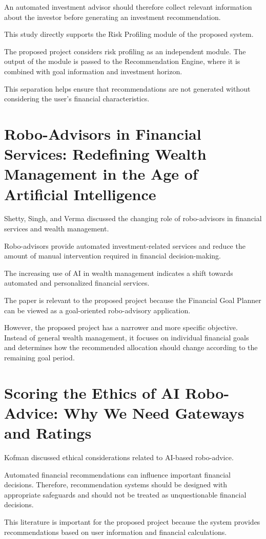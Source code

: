 An automated investment advisor should therefore collect relevant information about the investor before generating an investment recommendation.

This study directly supports the Risk Profiling module of the proposed system.

The proposed project considers risk profiling as an independent module. The output of the module is passed to the Recommendation Engine, where it is combined with goal information and investment horizon.

This separation helps ensure that recommendations are not generated without considering the user's financial characteristics.

\section{Robo-Advisors in Financial Services: Redefining Wealth Management in the Age of Artificial Intelligence}
Shetty, Singh, and Verma discussed the changing role of robo-advisors in financial services and wealth management.

Robo-advisors provide automated investment-related services and reduce the amount of manual intervention required in financial decision-making.

The increasing use of AI in wealth management indicates a shift towards automated and personalized financial services.

The paper is relevant to the proposed project because the Financial Goal Planner can be viewed as a goal-oriented robo-advisory application.

However, the proposed project has a narrower and more specific objective. Instead of general wealth management, it focuses on individual financial goals and determines how the recommended allocation should change according to the remaining goal period.

\section{Scoring the Ethics of AI Robo-Advice: Why We Need Gateways and Ratings}
Kofman discussed ethical considerations related to AI-based robo-advice.

Automated financial recommendations can influence important financial decisions. Therefore, recommendation systems should be designed with appropriate safeguards and should not be treated as unquestionable financial decisions.

This literature is important for the proposed project because the system provides recommendations based on user information and financial calculations.

